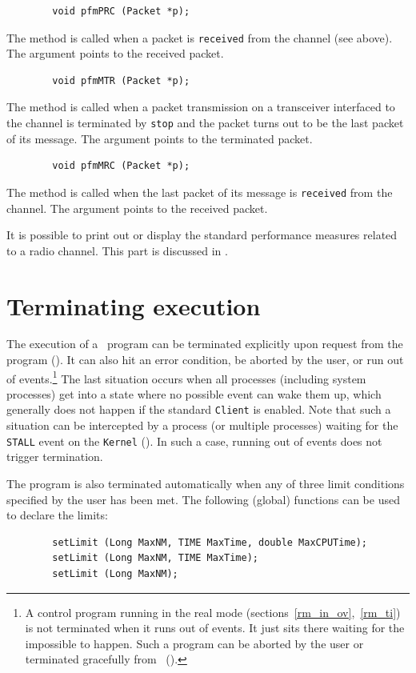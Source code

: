 \begin{verbatim}
        void pfmPRC (Packet *p);
\end{verbatim}
The method is called when a packet is {\tt received} from the channel
(see above).
The argument points to the received packet.

\begin{verbatim}
        void pfmMTR (Packet *p);
\end{verbatim}
The method is called when a packet transmission on a transceiver
interfaced to the channel
is terminated by {\tt stop} and the packet turns out to
be the last packet of its message.
The argument points to the terminated packet.

\begin{verbatim}
        void pfmMRC (Packet *p);
\end{verbatim}
The method is called when the last packet of its message
is {\tt received} from the channel.
The argument points to the received packet.

It is possible to print out or display
the standard performance measures related to a radio channel.
This part is discussed in .

\section{Terminating execution}
\label{rm_ts}

The execution of a \smurph\ program
can be terminated explicitly upon request from the program ().
It can also hit an error condition, be aborted by the user, or run
out of events.\footnote{A control program running in the real mode
(sections~\ref{rm_in_ov},~\ref{rm_ti}) is not terminated when it runs out of
events.
It just sits there waiting for the impossible to happen.
Such a program can be aborted by the user or terminated gracefully
from \dsd\ ().}
The last situation occurs when all processes (including system
processes) get into a state where no possible event can wake them up, which
generally does not happen if the standard {\tt Client} is enabled.
Note that such a situation can be intercepted by a process
(or multiple processes) waiting for the {\tt STALL} event on the
{\tt Kernel} ().
In such a case, running out of events does not trigger termination.

The program is also terminated automatically when any of three limit
conditions specified by the user has been met.
The following (global) functions can be used to declare the limits:
\begin{verbatim}
        setLimit (Long MaxNM, TIME MaxTime, double MaxCPUTime);
        setLimit (Long MaxNM, TIME MaxTime);
        setLimit (Long MaxNM);
\end{verbatim}

